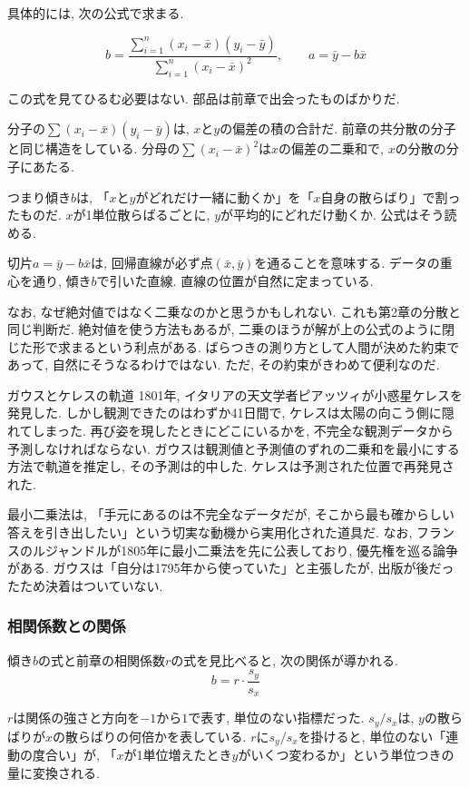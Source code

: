具体的には, 次の公式で求まる.

\[
  b = \frac{\displaystyle\sum_{i=1}^{n}(x_i - \bar{x})(y_i - \bar{y})}{\displaystyle\sum_{i=1}^{n}(x_i - \bar{x})^2}, \qquad a = \bar{y} - b\bar{x}
\]

この式を見てひるむ必要はない. 部品は前章で出会ったものばかりだ.

分子の$\sum(x_i - \bar{x})(y_i - \bar{y})$は, $x$と$y$の偏差の積の合計だ.
前章の共分散の分子と同じ構造をしている.
分母の$\sum(x_i - \bar{x})^2$は$x$の偏差の二乗和で, $x$の分散の分子にあたる.

つまり傾き$b$は, 「$x$と$y$がどれだけ一緒に動くか」を「$x$自身の散らばり」で割ったものだ.
$x$が1単位散らばるごとに, $y$が平均的にどれだけ動くか.
公式はそう読める.

切片$a = \bar{y} - b\bar{x}$は, 回帰直線が必ず点$(\bar{x}, \bar{y})$を通ることを意味する.
データの重心を通り, 傾き$b$で引いた直線.
直線の位置が自然に定まっている.

なお, なぜ絶対値ではなく二乗なのかと思うかもしれない.
これも第2章の分散と同じ判断だ.
絶対値を使う方法もあるが, 二乗のほうが解が上の公式のように閉じた形で求まるという利点がある.
ばらつきの測り方として人間が決めた約束であって, 自然にそうなるわけではない.
ただ, その約束がきわめて便利なのだ.

\begin{mybox}{ガウスとケレスの軌道}
1801年, イタリアの天文学者ピアッツィが小惑星ケレスを発見した.
しかし観測できたのはわずか41日間で, ケレスは太陽の向こう側に隠れてしまった.
再び姿を現したときにどこにいるかを, 不完全な観測データから予測しなければならない.
ガウスは観測値と予測値のずれの二乗和を最小にする方法で軌道を推定し, その予測は的中した.
ケレスは予測された位置で再発見された.

最小二乗法は, 「手元にあるのは不完全なデータだが, そこから最も確からしい答えを引き出したい」という切実な動機から実用化された道具だ.
なお, フランスのルジャンドルが1805年に最小二乗法を先に公表しており, 優先権を巡る論争がある.
ガウスは「自分は1795年から使っていた」と主張したが, 出版が後だったため決着はついていない.
\end{mybox}


\subsubsection*{相関係数との関係}

傾き$b$の式と前章の相関係数$r$の式を見比べると, 次の関係が導かれる.
\[
  b = r \cdot \frac{s_y}{s_x}
\]

$r$は関係の強さと方向を$-1$から$1$で表す, 単位のない指標だった.
$s_y / s_x$は, $y$の散らばりが$x$の散らばりの何倍かを表している.
$r$に$s_y / s_x$を掛けると, 単位のない「連動の度合い」が, 「$x$が1単位増えたとき$y$がいくつ変わるか」という単位つきの量に変換される.

